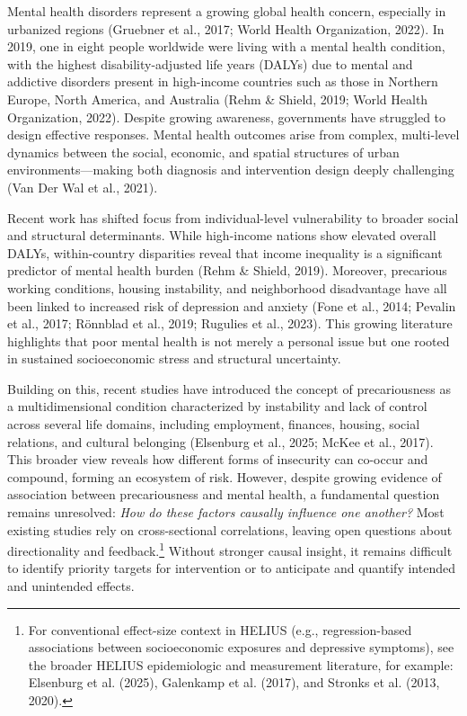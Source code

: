 \documentclass[
]{article}
\begin{document}
Mental health disorders represent a growing global health concern,
especially in urbanized regions (Gruebner et al., 2017; World Health
Organization, 2022). In 2019, one in eight people worldwide were living
with a mental health condition, with the highest disability-adjusted
life years (DALYs) due to mental and addictive disorders present in
high-income countries such as those in Northern Europe, North America,
and Australia (Rehm \& Shield, 2019; World Health Organization, 2022).
Despite growing awareness, governments have struggled to design
effective responses. Mental health outcomes arise from complex,
multi-level dynamics between the social, economic, and spatial
structures of urban environments---making both diagnosis and
intervention design deeply challenging (Van Der Wal et al., 2021).

Recent work has shifted focus from individual-level vulnerability to
broader social and structural determinants. While high-income nations
show elevated overall DALYs, within-country disparities reveal that
income inequality is a significant predictor of mental health burden
(Rehm \& Shield, 2019). Moreover, precarious working conditions, housing
instability, and neighborhood disadvantage have all been linked to
increased risk of depression and anxiety (Fone et al., 2014; Pevalin et
al., 2017; Rönnblad et al., 2019; Rugulies et al., 2023). This growing
literature highlights that poor mental health is not merely a personal
issue but one rooted in sustained socioeconomic stress and structural
uncertainty.

Building on this, recent studies have introduced the concept of
precariousness as a multidimensional condition characterized by
instability and lack of control across several life domains, including
employment, finances, housing, social relations, and cultural belonging
(Elsenburg et al., 2025; McKee et al., 2017). This broader view reveals
how different forms of insecurity can co-occur and compound, forming an
ecosystem of risk. However, despite growing evidence of association
between precariousness and mental health, a fundamental question remains
unresolved: \emph{How do these factors causally influence one another?}
Most existing studies rely on cross-sectional correlations, leaving open
questions about directionality and
feedback.\footnote{\textcolor{BrickRed}{For conventional effect-size context in HELIUS (e.g., regression-based associations between socioeconomic exposures and depressive symptoms), see the broader HELIUS epidemiologic and measurement literature, for example: Elsenburg et al. (2025), Galenkamp et al. (2017), and Stronks et al. (2013, 2020).}}
Without stronger causal insight, it remains difficult to identify
priority targets for intervention or to anticipate and quantify intended
and unintended effects.
\end{document}

